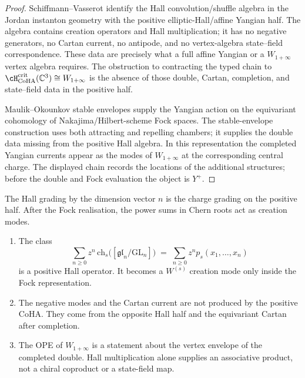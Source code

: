 \begin{proof}
Schiffmann--Vasserot identify the Hall convolution/shuffle algebra
in the Jordan instanton geometry with the positive elliptic-Hall/affine
Yangian half. The algebra contains creation operators and Hall
multiplication; it has no negative generators, no Cartan current, no
antipode, and no vertex-algebra state--field correspondence. These data
are precisely what a full affine Yangian or a $W_{1+\infty}$ vertex
algebra requires. The obstruction to contracting the typed chain to
$\cH_{\mathrm{CoHA}}^{\mathrm{crit}}(\CC^3)\cong W_{1+\infty}$ is the
absence of those double, Cartan, completion, and state--field data in
the positive half.

Maulik--Okounkov stable envelopes supply the Yangian action on the
equivariant cohomology of Nakajima/Hilbert-scheme Fock spaces. The
stable-envelope construction uses both attracting and repelling
chambers; it supplies the double data missing from the positive Hall
algebra. In this representation the completed Yangian currents
appear as the modes of $W_{1+\infty}$ at the corresponding central
charge. The displayed chain records the locations of the additional
structures; before the double and Fock evaluation the object is $Y^+$.
\end{proof}

\begin{remark}
\label{rem:coha-scope-SV-coincidence}
The Hall grading by the dimension vector $n$ is the charge grading
on the positive half. After the Fock realisation, the power sums in
Chern roots act as creation modes.
\begin{enumerate}[label=\textup{(\roman*)}]
\item The class
 \[
 \sum_{n \ge 0} z^n\,
 \mathrm{ch}_s\bigl([\mathfrak{gl}_n / \mathrm{GL}_n]\bigr)
 \;=\;
 \sum_{n \ge 0} z^n p_s(x_1,\ldots,x_n)
 \]
 is a positive Hall operator. It becomes a $W^{(s)}$ creation mode only
 inside the Fock representation.
\item The negative modes and the Cartan current are not produced by
 the positive CoHA. They come from the opposite Hall half and the
 equivariant Cartan after completion.
\item The OPE of $W_{1+\infty}$ is a statement about the vertex
 envelope of the completed double. Hall multiplication alone supplies
 an associative product, not a chiral coproduct or a state-field map.
\end{enumerate}
\end{remark}


